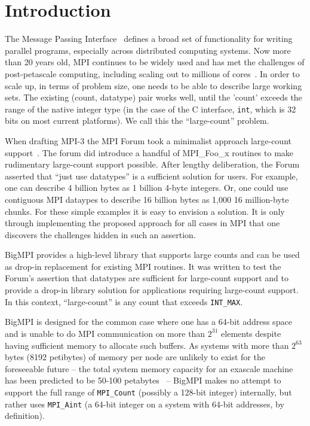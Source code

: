 
\section{Introduction}

The Message Passing Interface~\cite{mpiforum:94, mpiforum:96, mpiforum:09, mpiforum:12} 
defines a broad set of functionality for writing parallel programs, especially across
distributed computing systems.
Now more than 20 years old, MPI continues to be widely used and has met the challenges of
post-petascale computing, including scaling out to millions of cores~\cite{balaji2011mpi}. 
In order to scale up, in terms of problem size, one needs
to be able to describe large working sets.  The existing (count, datatype) pair
works well, until the 'count' exceeds the range of the native integer type
(in the case of the C interface, \texttt{int}, which is 32 bits on most current platforms).
We call this the ``large-count'' problem.

When drafting MPI-3 the MPI Forum took a minimalist approach large-count 
support~\cite{squyres-blog-large-count,ticket265}.
The forum did introduce a handful of MPI\_Foo\_x routines to make rudimentary
large-count support possible.  After lengthy deliberation, the
Forum asserted that ``just use datatypes'' is a sufficient solution for users.
For example, one can describe 4 billion bytes as 1 billion 4-byte integers.
Or, one could use contiguous MPI dataypes to describe 16 billion bytes as 1,000
16 million-byte chunks.  For these simple examples it is easy to envision a
solution. It is only through implementing the proposed approach for all cases
in MPI that one discovers the challenges hidden in such an assertion.

BigMPI provides a high-level library that supports large counts and can be used as 
drop-in replacement for existing MPI routines.  It was written to test the Forum's assertion
that datatypes are sufficient for large-count support and to provide a drop-in library
solution for applications requiring large-count support.
In this context, ``large-count'' is any count that exceeds \texttt{INT\_MAX}. 

BigMPI is designed for the common case where one has a 64-bit address
space and is unable to do MPI communication on more than $2^{31}$ elements
despite having sufficient memory to allocate such buffers.
As systems with more than $2^{63}$ bytes (8192 petibytes) of memory 
per node are unlikely to exist for the foreseeable future --
the total system memory capacity for an exascale machine has been 
predicted to be 50-100 petabytes~\cite{shalf2011exascale} --
BigMPI makes no attempt to support the full range of \texttt{MPI\_Count}
(possibly a 128-bit integer) internally, but rather uses \texttt{MPI\_Aint}
(a 64-bit integer on a system with 64-bit addresses, by definition).

